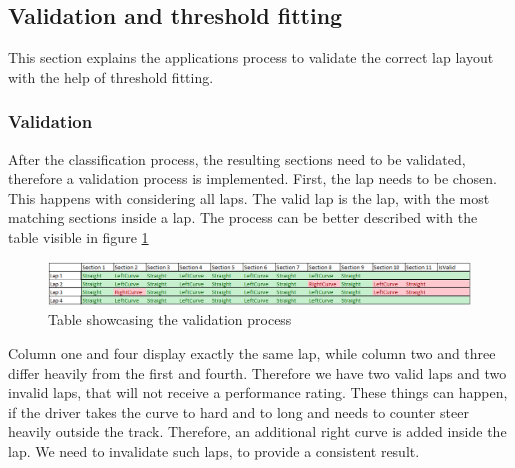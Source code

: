 \subsection{Validation and threshold fitting}
This section explains the applications process to validate the correct lap layout with the help of threshold fitting.

\subsubsection{Validation}
After the classification process, the resulting sections need to be validated, therefore a validation process is implemented. First, the lap needs to be chosen. This happens with considering all laps. The valid lap is the lap, with the most matching sections inside a lap. The process can be better described with the table visible in figure \ref{validation}
\begin{figure}[H]
	\centering
	\includegraphics[scale= 0.5]{Pictures/validation.png}
	\caption{Table showcasing the validation process}
	\label{validation}
\end{figure}
Column one and four display exactly the same lap, while column two and three differ heavily from the first and fourth. Therefore we have two valid laps and two invalid laps, that will not receive a performance rating. These things can happen, if the driver takes the curve to hard and to long and needs to counter steer heavily outside the track. Therefore, an additional right curve is added inside the lap. We need to invalidate such laps, to provide a consistent result.
\newpage
